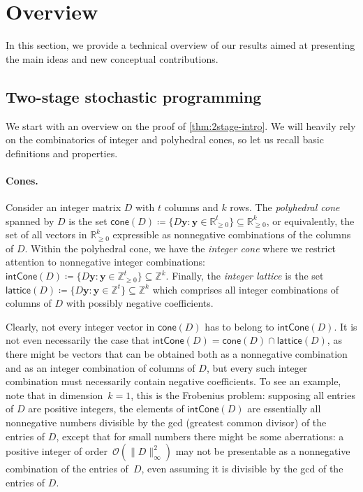 \documentclass{theoretics}
\renewcommand{\geq}{\geqslant}
\newcommand{\Z}{\mathbb{Z}}
\newcommand{\Zn}{\Z_{\geq 0}}
\newcommand{\R}{\mathbb{R}}
\newcommand{\myRn}{\R_{\geq 0}} %
\newcommand{\tup}[1]{{\mathbf{#1}}}
\newcommand{\yy}{\tup y}
\newcommand{\Oh}{{\mathcal{O}}}
\newcommand{\realcone}{\mathsf{cone}}
\newcommand{\intcone}{\mathsf{intCone}}
\newcommand{\lattice}{\mathsf{lattice}}
\begin{document}
\section{Overview}\label{sec:overview}

In this section, we provide a technical overview of our results aimed at presenting the main ideas and new conceptual contributions.

\subsection{Two-stage stochastic programming}

We start with an overview on the proof of \cref{thm:2stage-intro}. We will heavily rely on the combinatorics of integer and polyhedral cones, so let us recall basic definitions and properties.

\paragraph*{Cones.} Consider an integer  matrix $D$ with $t$ columns and $k$ rows. The {\em{polyhedral cone}} spanned by $D$ is the set $\realcone(D)\coloneqq\{D\yy\colon \yy\in \myRn^t\}\subseteq \myRn^k$, or equivalently, the set of all vectors in $\myRn^k$ expressible as nonnegative combinations of the columns of $D$. Within the polyhedral cone, we have the {\em{integer cone}} where we restrict attention to nonnegative integer combinations: $\intcone(D)\coloneqq\{D\yy\colon \yy\in \Zn^t\}\subseteq \Z^k$. Finally, the {\em{integer lattice}} is the set $\lattice(D)\coloneqq\{D\yy\colon \yy\in \Z^t\}\subseteq \Z^k$ which comprises all integer combinations of columns of $D$ with possibly negative coefficients.

Clearly, not every integer vector in $\realcone(D)$ has to belong to $\intcone(D)$. It is not even necessarily the case that $\intcone(D)=\realcone(D)\cap \lattice(D)$, as there might be vectors that can be obtained both as a nonnegative combination and as an integer combination of columns of $D$, but every such integer combination must necessarily contain negative coefficients. To see an example, note that in dimension~$k=1$, this is the Frobenius problem: supposing all entries of $D$ are positive integers, the elements of $\intcone(D)$ are essentially all nonnegative numbers divisible by the gcd (greatest common divisor) of the entries of $D$, except that for small numbers there might be some aberrations: a positive integer of order~$\Oh(\|D\|_\infty^2)$ may not be presentable as a nonnegative combination of the entries of~$D$, even assuming it is divisible by the gcd of the entries of $D$.
\end{document}
